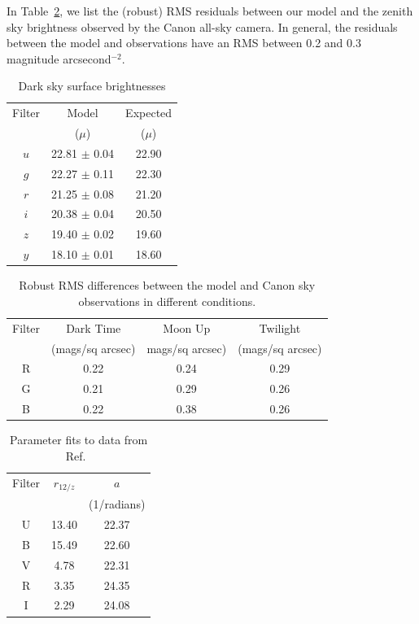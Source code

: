 \documentclass[]{spie}
\begin{document}
In Table~\ref{table:zenithRMSSky}, we list the (robust) RMS residuals between our model and the zenith sky brightness observed by the Canon all-sky camera. In general, the residuals between the model and observations have an RMS between 0.2 and 0.3 magnitude arcsecond$^{-2}$.  


\clearpage

\begin{table}
  \caption{Dark sky surface brightnesses }
  \label{table:darkSky}
  \begin{center}
  \begin{tabular}{c c  c}
  Filter & Model & Expected\cite{Ivezic08} \\
  & ($\mu$) &  ($\mu$)  \\
  \hline
  \hline
  $u$ &    22.81 $\pm$  0.04  &  22.90 \\
  $g$ &    22.27 $\pm$  0.11  &  22.30 \\
  $r$ &    21.25 $\pm$  0.08  &  21.20 \\
  $i$ &    20.38 $\pm$  0.04  &  20.50 \\
  $z$ &    19.40 $\pm$  0.02  &  19.60 \\
  $y$ &    18.10 $\pm$  0.01  &  18.60 
  \end{tabular}
  \end{center}
\end{table}


\begin{table}
  
  \caption{ Robust RMS differences between the model and Canon sky observations in different conditions.}
  \label{table:zenithRMSSky}
  \begin{center}
  \begin{tabular}{c c c c}
  Filter & Dark Time & Moon Up & Twilight \\
  & (mags/sq arcsec)   & mags/sq arcsec) & (mags/sq arcsec) \\
  \hline
  \hline
  R & 0.22 & 0.24 & 0.29 \\
  G & 0.21 & 0.29 & 0.26 \\
  B & 0.22 & 0.38 & 0.26 
  \end{tabular}
  \end{center}
\end{table}


\begin{table}
  \caption{Parameter fits to data from Ref.~}
  \label{table:PatatFits}
  \begin{center}
  \begin{tabular}{c c c}
  Filter & $r_{12/z}$ & $a$  \\
  & & (1/radians) \\
  \hline
  \hline
  U & 13.40 & 22.37 \\
  B & 15.49 & 22.60 \\
  V & 4.78  & 22.31 \\
  R & 3.35  & 24.35 \\
  I & 2.29  & 24.08
\end{tabular}
\end{center}
\end{table}
\end{document}
